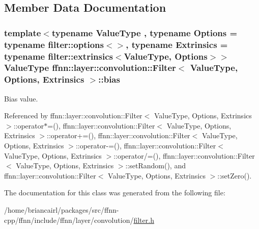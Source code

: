 \subsection{Member Data Documentation}
\hypertarget{classffnn_1_1layer_1_1convolution_1_1_filter_a3638f1ebfd8d5d4469392dd7b2470cc3}{
\subsubsection[{bias}]{\setlength{\rightskip}{0pt plus 5cm}template$<$typename Value\-Type , typename Options  = typename filter\-::options$<$$>$, typename Extrinsics  = typename filter\-::extrinsics$<$\-Value\-Type, Options$>$$>$ Value\-Type {\bf ffnn\-::layer\-::convolution\-::\-Filter}$<$ Value\-Type, Options, Extrinsics $>$\-::bias}}\label{classffnn_1_1layer_1_1convolution_1_1_filter_a3638f1ebfd8d5d4469392dd7b2470cc3}


Bias value. 



Referenced by ffnn\-::layer\-::convolution\-::\-Filter$<$ Value\-Type, Options, Extrinsics $>$\-::operator$\ast$=(), ffnn\-::layer\-::convolution\-::\-Filter$<$ Value\-Type, Options, Extrinsics $>$\-::operator+=(), ffnn\-::layer\-::convolution\-::\-Filter$<$ Value\-Type, Options, Extrinsics $>$\-::operator-\/=(), ffnn\-::layer\-::convolution\-::\-Filter$<$ Value\-Type, Options, Extrinsics $>$\-::operator/=(), ffnn\-::layer\-::convolution\-::\-Filter$<$ Value\-Type, Options, Extrinsics $>$\-::set\-Random(), and ffnn\-::layer\-::convolution\-::\-Filter$<$ Value\-Type, Options, Extrinsics $>$\-::set\-Zero().



The documentation for this class was generated from the following file\-:\begin{DoxyCompactItemize}
\item 
/home/briancairl/packages/src/ffnn-\/cpp/ffnn/include/ffnn/layer/convolution/\hyperlink{filter_8h}{filter.\-h}\end{DoxyCompactItemize}
